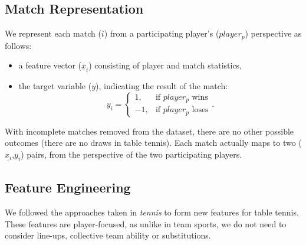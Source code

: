 
\subsection{Match Representation}
We represent each match ($i$) from a participating player's ($player_p$) perspective as follows:
\begin{itemize}
    \item a feature vector ($\underline{x}_i$) consisting of player and  match statistics,
    \item{
     the target variable ($y$), indicating the result of the match: %
     \begin{equation}
        y_i =
        \begin{cases}
        1, &\text{if $player_p$ wins} \\ 
        -1, &\text{if $player_p$ loses}
        \end{cases}.
    \end{equation}
     }
\end{itemize}



With incomplete matches removed from the dataset, there are no other possible outcomes (there are no draws in table tennis). Each match actually maps to two ($\underline{x_i}$,$y_i$) pairs, from the perspective of the two participating players.

\subsection{Feature Engineering}
\label{sec:engineer}
We followed the approaches taken in \textit{tennis}  \cite{barnett2005combining,sipko2015machine,cornman2017machine}  to form new features for table tennis. These features are player-focused, as unlike in team sports, we do not need to consider line-ups, collective team ability or substitutions.


